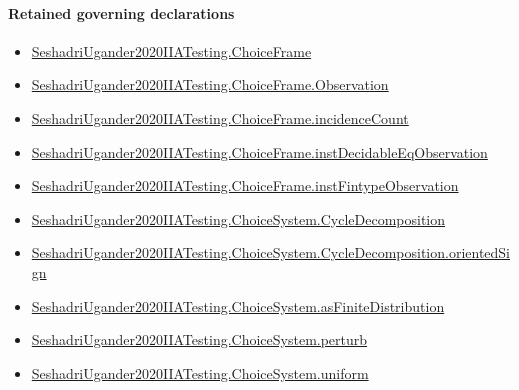 \documentclass[10pt]{article}
\begin{document}
\paragraph{Retained governing declarations}
\begin{itemize}\raggedright
\item \hyperlink{paper-prerequisite-0b24d39c6f4d1898}{Seshadri\allowbreak{}Ugander2020\allowbreak{}IIA\allowbreak{}Testing.\allowbreak{}Choice\allowbreak{}Frame}
\item \hyperlink{paper-prerequisite-d450557e9618e377}{Seshadri\allowbreak{}Ugander2020\allowbreak{}IIA\allowbreak{}Testing.\allowbreak{}Choice\allowbreak{}Frame.\allowbreak{}Observation}
\item \hyperlink{governing-declaration-01f88aa0e8a82d94}{Seshadri\allowbreak{}Ugander2020\allowbreak{}IIA\allowbreak{}Testing.\allowbreak{}Choice\allowbreak{}Frame.\allowbreak{}incidence\allowbreak{}Count}
\item \hyperlink{governing-declaration-ad61eb0534c5ba6e}{Seshadri\allowbreak{}Ugander2020\allowbreak{}IIA\allowbreak{}Testing.\allowbreak{}Choice\allowbreak{}Frame.\allowbreak{}inst\allowbreak{}Decidable\allowbreak{}Eq\allowbreak{}Observation}
\item \hyperlink{governing-declaration-a7119ec24e922f45}{Seshadri\allowbreak{}Ugander2020\allowbreak{}IIA\allowbreak{}Testing.\allowbreak{}Choice\allowbreak{}Frame.\allowbreak{}inst\allowbreak{}Fintype\allowbreak{}Observation}
\item \hyperlink{paper-prerequisite-7ec2ce004f72e29f}{Seshadri\allowbreak{}Ugander2020\allowbreak{}IIA\allowbreak{}Testing.\allowbreak{}Choice\allowbreak{}System.\allowbreak{}Cycle\allowbreak{}Decomposition}
\item \hyperlink{governing-declaration-68ca32269bc85500}{Seshadri\allowbreak{}Ugander2020\allowbreak{}IIA\allowbreak{}Testing.\allowbreak{}Choice\allowbreak{}System.\allowbreak{}Cycle\allowbreak{}Decomposition.\allowbreak{}oriented\allowbreak{}Sign}
\item \hyperlink{governing-declaration-84db14e23cd406b0}{Seshadri\allowbreak{}Ugander2020\allowbreak{}IIA\allowbreak{}Testing.\allowbreak{}Choice\allowbreak{}System.\allowbreak{}as\allowbreak{}Finite\allowbreak{}Distribution}
\item \hyperlink{paper-prerequisite-32d90e854afe59fd}{Seshadri\allowbreak{}Ugander2020\allowbreak{}IIA\allowbreak{}Testing.\allowbreak{}Choice\allowbreak{}System.\allowbreak{}perturb}
\item \hyperlink{governing-declaration-2f9ec7a44c87f45e}{Seshadri\allowbreak{}Ugander2020\allowbreak{}IIA\allowbreak{}Testing.\allowbreak{}Choice\allowbreak{}System.\allowbreak{}uniform}

\end{itemize}
\end{document}
